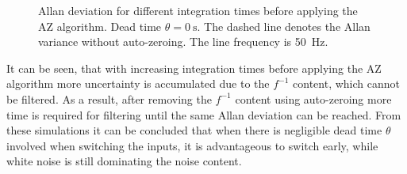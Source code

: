 \begin{figure}[ht]
    \centering
    
    \caption{Allan deviation for different integration times before applying the AZ algorithm. Dead time $\theta = \qty{0}{\s}$. The dashed line denotes the Allan variance without auto-zeroing. The line frequency is \qty{50}{\Hz}.}
    \label{fig:autozero_nplcs_adev}
\end{figure}

It can be seen, that with increasing integration times before applying the AZ algorithm more uncertainty is accumulated due to the $f^{-1}$ content, which cannot be filtered. As a result, after removing the $f^{-1}$ content using auto-zeroing more time is required for filtering until the same Allan deviation can be reached. From these simulations it can be concluded that when there is negligible dead time $\theta$ involved when switching the inputs, it is advantageous to switch early, while white noise is still dominating the noise content.%


